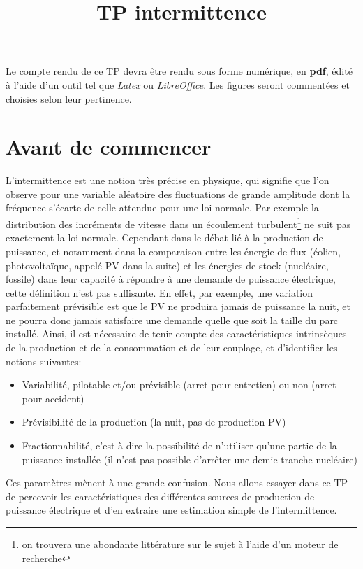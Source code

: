 \documentclass[12pt,a4]{article}
\begin{document}
\title{TP intermittence}

\maketitle

Le compte rendu de ce TP devra être rendu sous forme numérique, en \textbf{pdf},
édité à l'aide d'un outil tel que \textit{Latex} ou \textit{LibreOffice}. Les figures seront
commentées et choisies selon leur pertinence.

\section{Avant de commencer}

L'intermittence est une notion très précise en physique, qui signifie que
l'on observe pour une variable aléatoire des fluctuations de grande amplitude dont la fréquence s'écarte de celle attendue pour une loi normale. Par exemple la distribution des incréments de vitesse dans un écoulement turbulent\footnote{on trouvera une abondante littérature sur le sujet à l'aide d'un moteur de recherche} ne suit pas exactement la loi normale.
Cependant dans le débat lié à
la production de puissance, et notamment dans la comparaison entre les
énergie de flux (éolien, photovoltaïque, appelé PV dans la suite) et les énergies de stock (nucléaire,
fossile) dans leur capacité à répondre à une demande de puissance
électrique, cette définition n'est pas suffisante. En effet, par exemple,
une variation parfaitement prévisible est que le PV ne produira jamais de
puissance la nuit, et ne pourra donc jamais satisfaire une demande quelle que
soit la taille du parc installé. Ainsi, il est nécessaire de tenir compte
des caractéristiques intrinsèques de la production et de la consommation et
de leur couplage, et d'identifier les notions suivantes:
\begin{itemize}
  \item Variabilité, pilotable et/ou prévisible (arret pour entretien) ou
  non (arret pour accident)
  
  \item Prévisibilité de la production (la nuit, pas de production PV)
  
  \item Fractionnabilité, c'est à dire la possibilité de n'utiliser qu'une
  partie de la puissance installée (il n'est pas possible d'arrêter une demie tranche nucléaire)  
\end{itemize}
Ces paramètres mènent à une grande confusion. Nous allons essayer dans ce
TP de percevoir les caractéristiques des différentes sources de production
de puissance électrique et d'en extraire une estimation simple de
l'intermittence.
\end{document}
